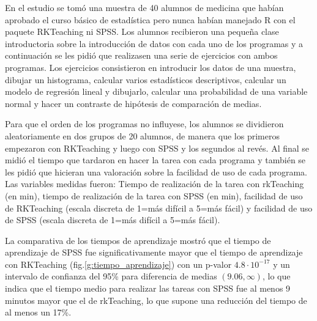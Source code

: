 \documentclass[10pt,twoside,spanish]{article}
\numberwithin{equation}{section}
\begin{document}
En el estudio se tomó una muestra de 40 alumnos de medicina que habían aprobado el curso básico de estadística pero nunca habían manejado R
con el paquete RKTeaching ni SPSS. 
Los alumnos recibieron una pequeña clase introductoria sobre la introducción de datos con cada uno de los
programas y a continuación se les pidió que realizasen una serie de ejercicios con ambos programas.
Los ejercicios consistieron en introducir los datos de una muestra, dibujar un histograma, calcular varios estadísticos descriptivos,
calcular un modelo de regresión lineal y dibujarlo, calcular una probabilidad de una variable normal y hacer un contraste de hipótesis de
comparación de medias.

Para que el orden de los programas no influyese, los alumnos se dividieron aleatoriamente en dos grupos de 20 alumnos, de manera que los
primeros empezaron con RKTeaching y luego con SPSS y los segundos al revés.
Al final se midió el tiempo que tardaron en hacer la tarea con cada programa y también se les pidió que hicieran una valoración sobre la
facilidad de uso de cada programa.
Las variables medidas fueron: Tiempo de realización de la tarea con rkTeaching (en min), tiempo de realización de la tarea con SPSS (en
min), facilidad de uso de RKTeaching (escala discreta de 1=más difícil a 5=más fácil) y facilidad de uso de SPSS (escala discreta de 1=más
difícil a 5=más fácil).

La comparativa de los tiempos de aprendizaje mostró que el tiempo de aprendizaje de SPSS fue significativamente mayor que el tiempo de
aprendizaje con RKTeaching (fig.\ref{g:tiempo_aprendizaje}) con un p-valor  $4.8\cdot 10^{-17}$ y un intervalo de confianza del 95\% para
diferencia de medias $(9.06, \infty)$, lo que indica que el tiempo medio para realizar las tareas con SPSS fue al menos 9 minutos mayor que el de
rkTeaching, lo que supone una reducción del tiempo de al menos un 17\%.
\end{document}

